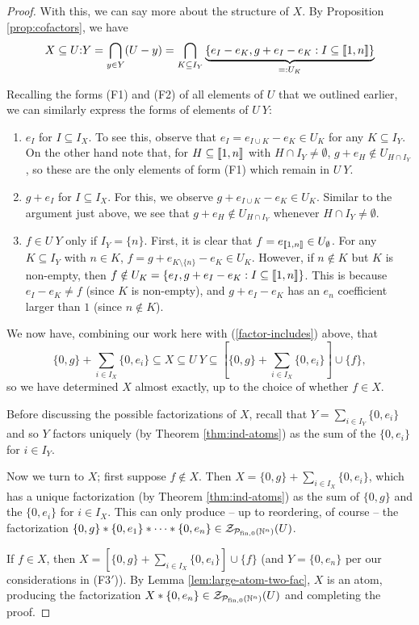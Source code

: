\begin{proof}
With this, we can say more about the structure of $X$.
By Proposition \ref{prop:cofactors}, we have 
\[X \subseteq U\text{:}Y = \bigcap_{y\in Y}(U-y) = \bigcap_{K\subseteq I_Y} \underbrace{\{e_I - e_K, g+e_I - e_K : I\subseteq \llbracket 1,n \rrbracket \}}_{=:U_K} \]

Recalling the forms (F1) and (F2) of all elements of $U$ that we outlined earlier, we can similarly express the forms of elements of $U\:Y$:
\begin{enumerate}[label={\rm (F\arabic{*}$'$)}]
\item $e_I$ for $I\subseteq I_X$. 
To see this, observe that $e_I = e_{I\cup K}-e_K\in U_K$ for any $K\subseteq I_Y$.
On the other hand note that, for $H \subseteq \llbracket 1,n \rrbracket$ with $H\cap I_Y\neq \emptyset$, $g+e_H\notin U_{H\cap I_Y}$, so these are the only elements of form (F1) which remain in $U\:Y$.
%
\item $g+e_I$ for $I\subseteq I_X$.
For this, we observe $g+e_{I\cup K} - e_K\in U_K$. 
Similar to the argument just above, we see that $g+e_H\notin U_{H\cap I_Y}$ whenever $H\cap I_Y\neq\emptyset$.
\item $f\in U\:Y$ only if $I_Y = \{n\}$.
First, it is clear that $f = e_{\llbracket 1,n \rrbracket} \in U_\emptyset$.
For any $K\subseteq I_Y$ with $n\in K$, $f = g+ e_{K\setminus\{n\}} - e_K\in U_K$.
However, if $n\notin K$ but $K$ is non-empty, then $f\notin U_K = \{e_I, g+e_I-e_K: I\subseteq \llbracket1,n\rrbracket\}$.
This is because $e_I - e_K \neq f$ (since $K$ is non-empty), and $g+e_I-e_K$ has an $e_n$ coefficient larger than $1$ (since $n\notin K$).
\end{enumerate}
We now have, combining our work here with (\ref{factor-includes}) above, that
\[ \{0,g\} + \sum_{i\in I_X}\{0,e_i\} \subseteq X \subseteq U\:Y \subseteq \left[\{0,g\}+\sum_{i\in I_X} \{0,e_i\} \right]\cup\{f\},\]
so we have determined $X$ almost exactly, up to the choice of whether $f\in X$.

Before discussing the possible factorizations of $X$, recall that $Y = \sum_{i\in I_Y} \{0,e_i\}$ and so $Y$ factors uniquely (by Theorem \ref{thm:ind-atoms}) as the sum of the $\{0,e_i\}$ for $i\in I_Y$.

Now we turn to $X$; first suppose $f\notin X$.
Then $X = \{0,g\} +\sum_{i\in I_X} \{0,e_i\}$, which has a unique factorization (by Theorem \ref{thm:ind-atoms}) as the sum of $\{0,g\}$ and the $\{0,e_i\}$ for $i\in I_X$.
This can only produce -- up to reordering, of course -- the factorization $\{0,g\}*\{0,e_1\}*\cdots*\{0,e_n\}\in \mathcal{Z}_{\mathcal{P}_{\textrm{fin}, 0}(\mathbb{N}^n)}(U)$.

If $f\in X$, then $X = \left[\{0,g\}+\sum_{i\in I_X} \{0,e_i\} \right]\cup\{f\}$ (and $Y = \{0,e_n\}$ per our considerations in (F3$'$)).
By Lemma \ref{lem:large-atom-two-fac}, $X$ is an atom, producing the factorization $X*\{0,e_n\}\in \mathcal{Z}_{\mathcal{P}_{\textrm{fin}, 0}(\mathbb{N}^n)}(U)$ and completing the proof.
\end{proof}



